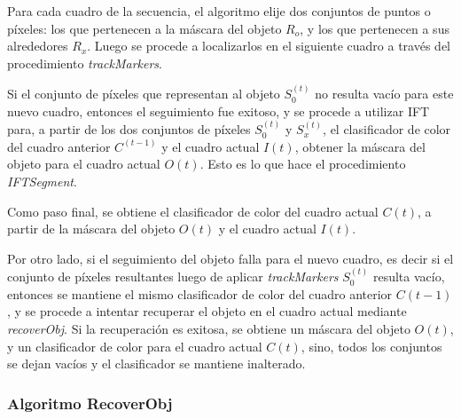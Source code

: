 \documentclass[a4paper,10pt]{article}
\begin{document}
Para cada cuadro de la secuencia, el algoritmo elije dos conjuntos de puntos o píxeles: los que pertenecen a la máscara del objeto $R_{o}$, y los que pertenecen a
sus alrededores $R_{x}$. Luego se procede
a localizarlos en el siguiente cuadro a través del procedimiento \textit{trackMarkers}.

Si el conjunto de píxeles que representan al objeto $S_{0}^{(t)}$ no resulta vacío para este
nuevo cuadro, entonces el seguimiento
fue exitoso, y se procede a utilizar IFT para, a partir de los dos conjuntos de píxeles $S_{0}^{(t)}$ y $S_{x}^{(t)}$, el clasificador de color del cuadro anterior $C^{(t-1)}$
y el cuadro actual $I{(t)}$, obtener la máscara del
objeto para el cuadro actual $O{(t)}$. Esto es lo que hace el procedimiento \textit{IFTSegment}.

Como paso final, se obtiene el clasificador de color del cuadro actual $C{(t)}$, a partir de la máscara del objeto $O{(t)}$ y el cuadro actual $I{(t)}$.

Por otro lado, si el seguimiento del objeto falla para el nuevo cuadro, es decir si el conjunto de píxeles resultantes luego de aplicar \textit{trackMarkers} $S_{0}^{(t)}$
resulta vacío, entonces se mantiene el mismo clasificador de color del cuadro anterior $C{(t-1)}$, y se procede
a intentar recuperar el objeto en el cuadro actual mediante \textit{recoverObj}. Si la recuperación
es exitosa, se obtiene un máscara del objeto $O{(t)}$, y un clasificador de color para el cuadro actual $C{(t)}$,
sino, todos los conjuntos se dejan vacíos y el clasificador se mantiene inalterado.\

\subsubsection{Algoritmo RecoverObj}
\end{document}

